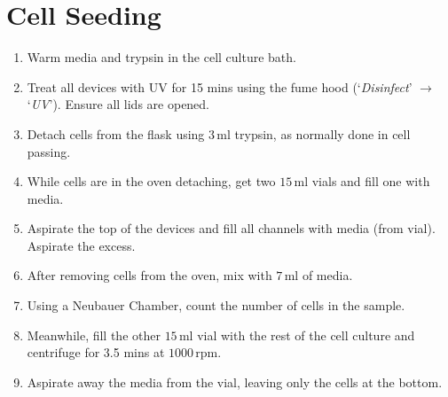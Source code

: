 \section{Cell Seeding}

\begin{enumerate}
			 \setlength\itemsep{-0.1em}
	\item Warm media and trypsin in the cell culture bath.
	\item Treat all devices with UV for 15 mins using the fume hood (`\textit{Disinfect}' $\rightarrow$ `\textit{UV}'). Ensure all lids are opened. 
	\item Detach cells from the flask using $3 \, \text{ml}$ trypsin, as normally done in cell passing.
	\item While cells are in the oven detaching, get two $15 \, \text{ml}$ vials and fill one with media.
	\item Aspirate the top of the devices and fill all channels with media (from vial). Aspirate the excess.
	\item After removing cells from the oven, mix with $7 \, \text{ml}$ of media. 
	\item Using a Neubauer Chamber, count the number of cells in the sample.
	\item Meanwhile, fill the other $15 \, \text{ml}$ vial with the rest of the cell culture and centrifuge for 3.5 mins at $1000 \, \text{rpm}$.
	\item Aspirate away the media from the vial, leaving only the cells at the bottom.

\end{enumerate}
